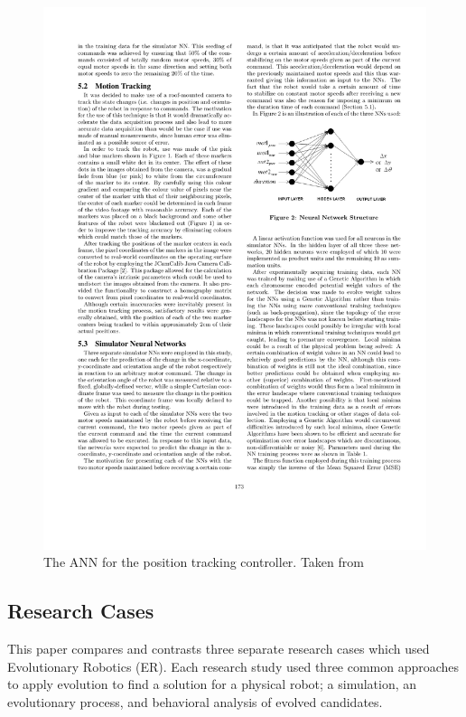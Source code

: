\documentclass{sig-alternate}
\begin{document}
\begin{figure}%
\begin{center}
  \includegraphics[scale=1]{cr2}

\end{center}
\caption{The ANN for the position tracking controller. Taken from ~\cite{Pretorius:2009:TAN:1632149.1632171}}
\label{fig:ANN}
\end{figure}
  
  
  \subsection{Research Cases}
	This paper compares and contrasts three separate research cases which used Evolutionary Robotics (ER). Each research study used three common approaches to apply evolution to find a solution for a physical robot; a simulation, an evolutionary process, and behavioral analysis of evolved candidates.
	
\end{document}
